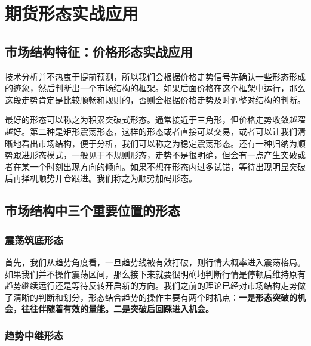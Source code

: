 \chapter{期货形态实战应用}
\section{市场结构特征：价格形态实战应用}
技术分析并不热衷于提前预测，所以我们会根据价格走势信号先确认一些形态形成的迹象，然后判断出一个市场结构的框架。如果后面价格在这个框架中运行，那么这段走势肯定是比较顺畅和规则的，否则会根据价格走势及时调整对结构的判断。

最好的形态可以称之为积累突破式形态。通常接近于三角形，但价格走势收敛越窄越好。第二种是矩形震荡形态，这样的形态或者直接可以交易，或者可以让我们清晰地看出市场结构，便于分析，我们可以称之为稳定震荡形态。还有一种归纳为顺势跟进形态模式，一般见于不规则形态，走势不是很明确，但会有一点产生突破或者在某一个时刻出现方向的倾向。如果不想在形态内过多试错，等待出现明显突破后再择机顺势开仓跟进。我们称之为顺势加码形态。
\section{市场结构中三个重要位置的形态}
\subsection{震荡筑底形态}
首先，我们从趋势角度看，一旦趋势线被有效打破，则行情大概率进入震荡格局。如果我们并不操作震荡区间，那么接下来就要很明确地判断行情是停顿后维持原有趋势继续运行还是等待反转开启新的方向。我们之前的理论已经对市场结构走势做了清晰的判断和划分，形态结合趋势的操作主要有两个时机点：\textbf{一是形态突破的机会，往往伴随着有效的量能。二是突破后回踩进入机会。}

\subsection{趋势中继形态}